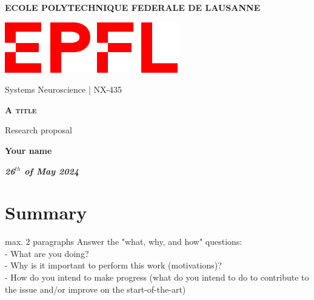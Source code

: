 \documentclass[11pt, notitlepage,a4]{article} %
\begin{document}
\onehalfspacing

\begin{titlepage}
	\centering
	{\textbf{ECOLE POLYTECHNIQUE FEDERALE DE LAUSANNE}\par}
    \vspace{1 cm}
	\includegraphics[scale=0.6]{figures/Logo_EPFL.pdf}\par\vspace{1cm}
Systems Neuroscience | NX-435\par
	\vspace{1cm}
	{\scshape\Large\textbf{A title}\par} %
	\vspace{1 cm}

    Research proposal
    \vspace{0.5 cm}
    
	{\large\textbf{Your name}\par} %
	
	\begin{flushleft}
	
	\vspace{5cm}
	
    \vspace{0.5 cm}
    \vspace{2 cm}
    
    \end{flushleft}
	{\large \textbf{\textit{26$^{th}$ of May 2024}}\par}
\end{titlepage}


\setcounter{page}{1}
\begin{center}


\end{center}



\section*{Summary}
\vspace{5pt}

max. 2 paragraphs
 Answer the  "what, why, and how" questions:\\
 - What are you doing?\\
- Why is it important to perform this work (motivations)?\\
 - How do you intend to make progress (what do you intend to do to contribute to the issue and/or improve on the start-of-the-art)\\
\end{document}
